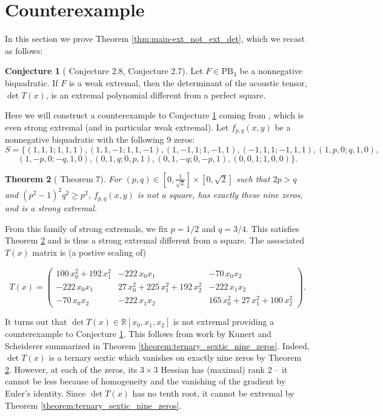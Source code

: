 \documentclass[a4paper]{article}
\numberwithin{equation}{section}
\newcommand{\R}{\mathbb{R}}
\newtheorem{theorem}{Theorem}[section]
\theoremstyle{definition}
\newtheorem{conjecture}[theorem]{Conjecture}
\theoremstyle{remark}
\begin{document}
\section{Counterexample}\label{sec:counterexample}
In this section we prove Theorem \ref{thm:main-ext_not_ext_det}, which we recast as follows:

\begin{conjecture}[\cite{HarutyunyanMiltonCPAM} Conjecture 2.8, \cite{harutyunyan2021extreme} Conjecture 2.7]\label{conj:counterexample}
Let $F\in \mathrm{PB}_{3}$ be a nonnegative biquadratic.  If $F$ is a weak extremal, then the determinant of the acoustic tensor, $\det T(x)$, is an extremal polynomial different from a perfect square.
\end{conjecture}
Here we will construct a counterexample to Conjecture \ref{conj:counterexample} coming from \cite{BS2020}, which is even strong extremal (and in particular weak extremal).
Let $f_{p,q}(x,y)$ be a nonnegative biquadratic with the following 9 zeros:
    $$S = \{(1, 1, 1; 1, 1, 1),(1, 1, -1; 1, 1, -1),(1, -1, 1; 1, -1, 1),(-1, 1, 1; -1, 1, 1),(1, p, 0; q, 1, 0),$$
$$    (1, -p, 0; -q, 1, 0),(0, 1, q; 0, p, 1), (0, 1,-q; 0,-p, 1), (0, 0, 1; 1, 0, 0)\}.$$

\begin{theorem}[\cite{BS2020} Theorem 7]\label{theorem:nine_zeros_extremal}
For $(p,q) \in [0,\frac{1}{\sqrt{2}}]\times [0,\sqrt{2}]$ such that $2p>q$ and $(p^2-1)^2q^2 \geq p^2$,
$f_{p,q}(x,y)$ is not a square, has exactly these nine zeros, and is a strong extremal.
\end{theorem}

From this family of strong extremals, we fix $p=1/2$ and $q=3/4$. This satisfies Theorem \ref{theorem:nine_zeros_extremal} and is thus a strong extremal different from a square.  The associated $T(x)$ matrix is (a postive scaling of)

$$T(x) = \left(\begin{array}{rrr}
100 \, x_{0}^{2} + 192 \, x_{1}^{2} & -222 \, x_{0} x_{1} & -70 \, x_{0} x_{2} \\
-222 \, x_{0} x_{1} & 27 \, x_{0}^{2} + 225 \, x_{1}^{2} + 192 \, x_{2}^{2} & -222 \, x_{1} x_{2} \\
-70 \, x_{0} x_{2} & -222 \, x_{1} x_{2} & 165 \, x_{0}^{2} + 27 \, x_{1}^{2} + 100 \, x_{2}^{2}
\end{array}\right).$$

It turns out that $\det T(x)\in\R[x_0,x_1,x_2]$ is not extremal providing a counterexample to Conjecture \ref{conj:counterexample}.  This follows from work by Kunert and Scheiderer summarized in Theorem \ref{theorem:ternary_sextic_nine_zeros}.
Indeed, $\det T(x)$ is a ternary sextic which vanishes on exactly nine zeros by Theorem \ref{theorem:nine_zeros_extremal}.
However, at each of the zeros, its $3\times 3$ Hessian has (maximal) rank 2 -- it cannot be less because of homogeneity and the vanishing of the gradient by Euler's identity. 
Since $\det T(x)$ has no tenth root, it cannot be extremal by Theorem \ref{theorem:ternary_sextic_nine_zeros}.
\end{document}
